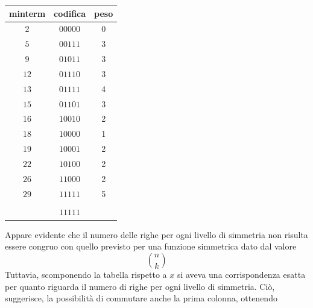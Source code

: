 \documentclass[a4paper]{extarticle}
\renewcommand\arraystretch{}
\begin{document}
\begin{itemize}
    \noindent
    \begin{table}[H]
    \setlength{\tabcolsep}{4pt}
    \renewcommand{\arraystretch}{1}
    \centering
    \begin{tabular}{|c|c|c|}
        minterm & codifica & peso\\
        \hline
        $2$ & $00000$ & 0\\
        $5$ & $00111$ & 3\\
        $9$ & $01011$ & 3\\
        $12$ & $01110$ & 3\\
        $13$ & $01111$ & 4\\
        $15$ & $01101$ & 3\\
        $16$ & $10010$ & 2\\
        $18$ & $10000$ & 1\\
        $19$ & $10001$ & 2\\
        $22$ & $10100$ & 2\\
        $26$ & $11000$ & 2\\
        $29$ & $11111$ & 5\\
        \hline
         & & \\
         & $11111$ & \\
    \end{tabular}
    \end{table}

    \vspace{1em}
    \noindent
    Appare evidente che il numero delle righe per ogni livello di simmetria non risulta essere congruo con quello previsto per una funzione simmetrica dato dal valore
    \[\binom{n}{k}\]
    Tuttavia, scomponendo la tabella rispetto a $x$ si aveva una corrispondenza esatta per quanto riguarda il numero di righe per ogni livello di simmetria. Ciò, suggerisce, la possibilità di commutare anche la prima colonna, ottenendo


\end{itemize}
\end{document}

